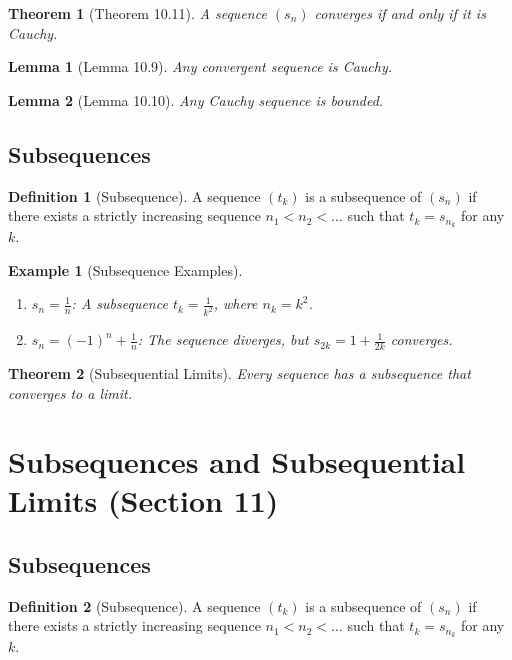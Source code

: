 \documentclass[9pt]{article}
\theoremstyle{definition}
\newtheorem{definition}{Definition}
\theoremstyle{plain}
\newtheorem{theorem}{Theorem}
\newtheorem{example}{Example}
\newtheorem{lemma}{Lemma}
\begin{document}
\begin{theorem}[Theorem 10.11]
A sequence $ (s_n) $ converges if and only if it is Cauchy.
\end{theorem}

\begin{lemma}[Lemma 10.9]
Any convergent sequence is Cauchy.
\end{lemma}

\begin{lemma}[Lemma 10.10]
Any Cauchy sequence is bounded.
\end{lemma}

\subsection*{Subsequences}
\begin{definition}[Subsequence]
A sequence $ (t_k) $ is a subsequence of $ (s_n) $ if there exists a strictly increasing sequence $ n_1 < n_2 < \ldots $ such that $ t_k = s_{n_k} $ for any $ k $.
\end{definition}

\begin{example}[Subsequence Examples]

\begin{enumerate}
    \item $ s_n = \frac{1}{n} $: A subsequence $ t_k = \frac{1}{k^2} $, where $ n_k = k^2 $.
    \item $ s_n = (-1)^n + \frac{1}{n} $: The sequence diverges, but $ s_{2k} = 1 + \frac{1}{2k} $ converges.
\end{enumerate}
\end{example}

\begin{theorem}[Subsequential Limits]
Every sequence has a subsequence that converges to a limit.
\end{theorem}
\section*{Subsequences and Subsequential Limits (Section 11)}

\subsection*{Subsequences}
\begin{definition}[Subsequence]
A sequence $ (t_k) $ is a subsequence of $ (s_n) $ if there exists a strictly increasing sequence $ n_1 < n_2 < \ldots $ such that $ t_k = s_{n_k} $ for any $ k $.
\end{definition}
\end{document}
